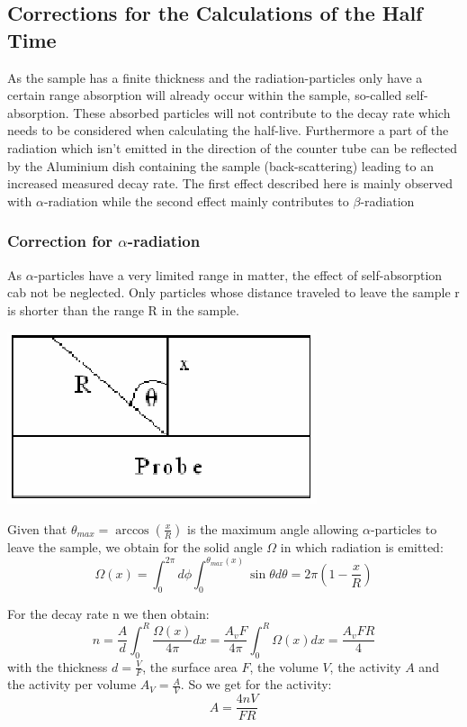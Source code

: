 \documentclass[12pt]{article}
\begin{document}
 \subsection{Corrections for the Calculations of the Half Time}
 
 As the sample has a finite thickness and the radiation-particles only have a certain range absorption will already occur within the sample, so-called self-absorption. These absorbed particles will not contribute to the decay rate which needs to be considered when calculating the half-live. Furthermore a part of the radiation which isn't emitted in the direction of the counter tube can be reflected by the Aluminium dish containing the sample (back-scattering) leading to an increased measured decay rate.
The first effect described here is mainly observed with $\alpha$-radiation while the second effect mainly contributes to $\beta$-radiation


\subsubsection{Correction for $\alpha$-radiation}\label{alphacorrection}

As $\alpha$-particles have a very limited range in matter, the effect of self-absorption cab not be neglected. Only particles whose distance traveled to leave the sample r is shorter than the range R in the sample. 

%
\vskip0.5cm
\begin{minipage}{\textwidth}
	\centering
	\includegraphics[width=.25\textwidth]{figures/alpha-Korrektur.png}
\end{minipage}
\vskip0.5cm
Given that $\theta_{max}=\arccos\left( \frac{x}{R}\right)$   is the maximum angle allowing $\alpha$-particles to leave the sample, we obtain for the 
solid angle $\Omega$ in which radiation is emitted:
\[\Omega(x)=\int_{0}^{2\pi}d\phi\int_{0}^{\theta_{max}(x)}\sin\theta d\theta = 2\pi\left( 1-\frac{x}{R}\right)\]

For the decay rate n we then obtain:
\[n= \frac{A}{d}\int_{0}^{R}\frac{\Omega(x)}{4\pi}dx = \frac{A_v F}{4\pi}\int_{0}^{R}\Omega(x)dx = \frac{A_v F R}{4}\]
with the thickness $d=\frac{V}{F}$, the surface area $F$, the volume $V$, the activity $A$ and the activity per volume $A_V=\frac{A}{V}$. So we get for the activity:
$$A=\frac{4nV}{FR}$$
\end{document}
